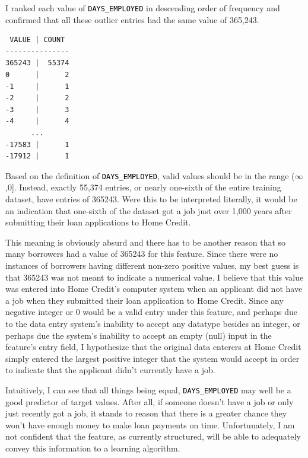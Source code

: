 \documentclass[12pt, letterpaper]{article}
\begin{document}
\pagebreak

I ranked each value of \colorbox{backcolor}{\textcolor{black}{\texttt{DAYS_EMPLOYED}}} in descending order of frequency and confirmed that all these outlier entries had the same value of 365,243.

\begin{lstlisting}
 VALUE | COUNT
---------------
365243 |  55374
0      |      2
-1     |      1
-2     |      2
-3     |      3
-4     |      4
      ...
-17583 |      1
-17912 |      1
\end{lstlisting}

Based on the definition of \colorbox{backcolor}{\textcolor{black}{\texttt{DAYS_EMPLOYED}}}, valid values should be in the range ($\infty$,0]. Instead, exactly 55,374 entries, or nearly one-sixth of the entire training dataset, have entries of 365243. Were this to be interpreted literally, it would be an indication that one-sixth of the dataset got a job just over 1,000 years after submitting their loan applications to Home Credit.

This meaning is obviously absurd and there has to be another reason that so many borrowers had a value of 365243 for this feature. Since there were no instances of borrowers having different non-zero positive values, my best guess is that 365243 was not meant to indicate a numerical value. I believe that this value was entered into Home Credit's computer system when an applicant did not have a job when they submitted their loan application to Home Credit. Since any negative integer or 0 would be a valid entry under this feature, and perhaps due to the data entry system's inability to accept any datatype besides an integer, or perhaps due the system's inability to accept an empty (null) input in the feature's entry field, I hypothesize that the original data enterers at Home Credit simply entered the largest positive integer that the system would accept in order to indicate that the applicant didn't currently have a job.

Intuitively, I can see that all things being equal, \colorbox{backcolor}{\textcolor{black}{\texttt{DAYS_EMPLOYED}}} may well be a good predictor of target values. After all, if someone doesn't have a job or only just recently got a job, it stands to reason that there is a greater chance they won't have enough money to make loan payments on time. Unfortunately, I am not confident that the feature, as currently structured, will be able to adequately convey this information to a learning algorithm.
\end{document}
